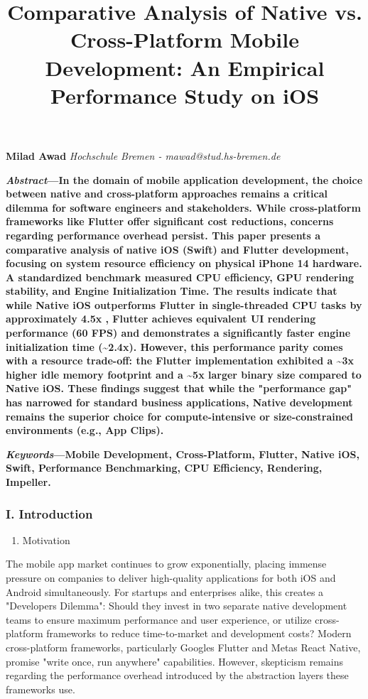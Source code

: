 \documentclass[
]{article}
\title{Comparative Analysis of Native vs. Cross-Platform Mobile
Development: An Empirical Performance Study on iOS}
\author{}
\date{}
\begin{document}
\maketitle

\textbf{Milad Awad} \emph{Hochschule Bremen - mawad@stud.hs-bremen.de}

\textbf{\emph{Abstract}---In the domain of mobile application
development, the choice between native and cross-platform approaches
remains a critical dilemma for software engineers and stakeholders.
While cross-platform frameworks like Flutter offer significant cost
reductions, concerns regarding performance overhead persist. This paper
presents a comparative analysis of native iOS (Swift) and Flutter
development, focusing on system resource efficiency on physical iPhone
14 hardware. A standardized benchmark measured CPU efficiency, GPU
rendering stability, and Engine Initialization Time. The results
indicate that while Native iOS outperforms Flutter in single-threaded
CPU tasks by approximately 4.5x , Flutter achieves equivalent UI
rendering performance (60 FPS) and demonstrates a significantly faster
engine initialization time (\textasciitilde2.4x). However, this
performance parity comes with a resource trade-off: the Flutter
implementation exhibited a \textasciitilde3x higher idle memory
footprint and a \textasciitilde5x larger binary size compared to Native
iOS. These findings suggest that while the "performance gap" has
narrowed for standard business applications, Native development remains
the superior choice for compute-intensive or size-constrained
environments (e.g., App Clips).}

\textbf{\emph{Keywords}---Mobile Development, Cross-Platform, Flutter,
Native iOS, Swift, Performance Benchmarking, CPU Efficiency, Rendering,
Impeller.}

\subsubsection{\texorpdfstring{\textbf{I.
Introduction}}{I. Introduction}}\label{i.-introduction}

\begin{enumerate}
\def\labelenumi{\Alph{enumi}.}
\item
  Motivation
\end{enumerate}

The mobile app market continues to grow exponentially, placing immense
pressure on companies to deliver high-quality applications for both iOS
and Android simultaneously. For startups and enterprises alike, this
creates a "Developer\textquotesingle s Dilemma": Should they invest in
two separate native development teams to ensure maximum performance and
user experience, or utilize cross-platform frameworks to reduce
time-to-market and development costs? Modern cross-platform frameworks,
particularly Google\textquotesingle s Flutter and Meta\textquotesingle s
React Native, promise "write once, run anywhere" capabilities. However,
skepticism remains regarding the performance overhead introduced by the
abstraction layers these frameworks use.
\end{document}
